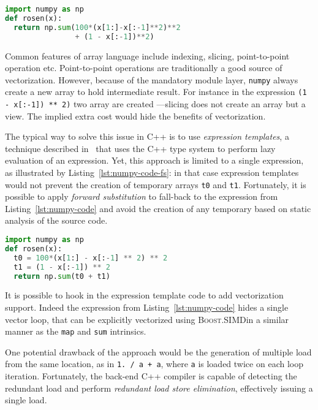 \documentclass[10pt]{sigplanconf}
\providecommand{\boostsimd}{\textsc{Boost.SIMD}}
\begin{document}
\begin{lstlisting}[language=python, label={lst:numpy-code}, caption={Sample \texttt{numpy} code.}]
import numpy as np
def rosen(x):
  return np.sum(100*(x[1:]-x[:-1]**2)**2
                + (1 - x[:-1])**2)
\end{lstlisting}

Common features of array language include indexing, slicing, point-to-point
operation etc. Point-to-point operations are traditionally a good source of
vectorization. However, because of the mandatory module layer, \texttt{numpy}
always create a new array to hold intermediate result. For instance in the
expression \texttt{(1 - x[:-1]) ** 2)} two array are created ---slicing does
not create an array but a view. The implied extra cost would hide the benefits
of vectorization.

The typical way to solve this issue in C++ is to use \emph{expression
templates}, a technique described in~\cite{expression_templates} that uses the
C++ type system to perform lazy evaluation of an expression. Yet, this
approach is limited to a single expression, as illustrated by Listing~\ref{lst:numpy-code-fs}: in that case expression templates would not prevent the creation
of temporary arrays \texttt{t0} and \texttt{t1}. Fortunately, it is possible to
apply \emph{forward substitution} to fall-back to the expression from
Listing~\ref{lst:numpy-code} and avoid the creation of any temporary based on
static analysis of the source code.

\begin{lstlisting}[language=python, label={lst:numpy-code-fs}, caption={Sample \texttt{numpy} code requiring forward subsitution.}]
import numpy as np
def rosen(x):
  t0 = 100*(x[1:] - x[:-1] ** 2) ** 2
  t1 = (1 - x[:-1]) ** 2
  return np.sum(t0 + t1)
\end{lstlisting}

It is possible to hook in the expression template code to add vectorization support.
Indeed the expression from Listing~\ref{lst:numpy-code} hides a single vector
loop, that can be explicitly vectorized using \boostsimd in a similar manner as
the \texttt{map} and \texttt{sum} intrinsics.

One potential drawback of the approach would be the generation of multiple load
from the same location, as in \texttt{1. / a + a}, where \texttt{a} is loaded
twice on each loop iteration. Fortunately, the back-end C++ compiler is capable
of detecting the redundant load and perform \emph{redundant load store
elimination}, effectively issuing a single load.
\end{document}

